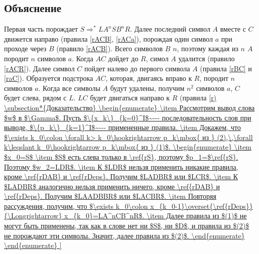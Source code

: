 \documentclass[a4paper]{article}
\begin{document}
\subsection*{Объяснение}
Первая часть порождает $S\Longrightarrow^* LA^nSB^nR$. Далее последний символ $A$ вместе с $C$ движется направо (правила \ref{rACB}, \ref{rACa}), порождая один символ $a$ при проходе через $B$ (правило \ref{rACB}). Всего символов $B$ $n$, поэтому каждая из $n$ $A$ породит $n$ символов $a$. Когда $AC$ дойдет до $R$, симол $A$ удалится (правило \ref{rACR}). Далее символ $C$ пойдет налево до первого символа $A$ (правила \ref{rBC} и \ref{raC}). Образуется подстрока $AC$, которая, двигаясь вправо к $R$, породит $n$ символов $a$. Когда все символы $A$ будут удалены, получим $n^2$ символов $a$, $C$ будет слева, рядом с $L$. $LC$ будет двигаться направо к $R$ (правила \ref{r)
\subsection*{Доказательство}
\begin{enumerate}
\item Рассмотрим вывод слова $w$ в $\Gamma$. Пусть $\{x_k\}_{k=0}^I$~--- последовательность слов при выводе, $\{p_k\}_{k=1}^I$~--- примененные правила.
\item Докажем, что $\exists k_0\colon \forall k> k_0\hookrightarrow p_k\mbox{ из } (2),\,\forall k\leqslant k_0\hookrightarrow p_k\mbox{ из } (1)$. \begin{enumerate}
\item $x_0=S$
\item $S$ есть слева только в \ref{rS}, поэтому $p_1=$\ref{rS}. Поэтому $w_2=LDR$.
\item К $LDR$ нельзя применить никакие правила, кроме \ref{rDAB} и \ref{rDeps}. Получим $LADBR$ или $LCR$.
\item К $LADBR$ аналогично нельзя применить ничего, кроме \ref{rDAB} и \ref{rDeps}. Получим $LAADBBR$ или $LACBR$.
\item Повторяя рассуждения, получим, что $\exists k_0\colon x_{k_0-1}\overset{\ref{rDeps}}{\Longrightarrow} x_{k_0}=LA^nCB^nR$.
\item Далее правила из $(1)$ не могут быть применены, так как в слове нет ни $S$, ни $D$, и правила из $(2)$ не порождают эти символы. Значит, далее правила из $(2)$.
\end{enumerate}
\end{enumerate}
}
\end{document}
